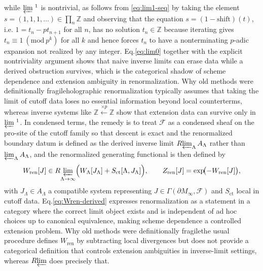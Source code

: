 \documentclass[11pt]{article}
\theoremstyle{remark}
\newcommand{\Z}{\mathbb{Z}}
\begin{document}
while \(\varprojlim{}^{\,1}\) is nontrivial, as follows from \eqref{eq:lim1-seq} by taking the element \(s=(1,1,1,\ldots)\in \prod_n \Z\) and observing that the equation \(s=(1-\mathrm{shift})(t)\), i.e. \(1=t_n-p t_{n+1}\) for all \(n\), has no solution \(t_n\in\Z\) because iterating gives \(t_n\equiv 1\ (\mathrm{mod}\ p^k)\) for all \(k\) and hence forces \(t_n\) to have a nonterminating \(p\)-adic expansion not realized by any integer. Eq.\eqref{eq:lim0} together with the explicit nontriviality argument shows that naive inverse limits can erase data while a derived obstruction survives, which is the categorical shadow of scheme dependence and extension ambiguity in renormalization. Why old methods were definitionally fragile\:holographic renormalization typically assumes that taking the limit of cutoff data loses no essential information beyond local counterterms, whereas inverse systems like \(\Z\xleftarrow{\times p}\Z\) show that extension data can survive only in \(\varprojlim{}^{\,1}\). In condensed terms, the remedy is to treat \(\mathcal{F}\) as a condensed sheaf on the pro-site of the cutoff family so that descent is exact and the renormalized boundary datum is defined as the derived inverse limit \(R\!\varprojlim_{\Lambda}A_{\Lambda}\) rather than \(\varprojlim_{\Lambda}A_{\Lambda}\), and the renormalized generating functional is then defined by
\begin{equation}\label{eq:Wren-derived}
W_{\mathrm{ren}}[J]\in R\!\varprojlim_{\Lambda\to\infty}\Bigl(W_{\Lambda}[J_{\Lambda}]+S_{\mathrm{ct}}[\Lambda,J_{\Lambda}]\Bigr),
\qquad
Z_{\mathrm{ren}}[J]=\exp\!\bigl(-W_{\mathrm{ren}}[J]\bigr),
\end{equation}
with \(J_{\Lambda}\in A_{\Lambda}\) a compatible system representing \(J\in \Gamma(\partial M_{\infty},\mathcal{F})\) and \(S_{\mathrm{ct}}\) local in cutoff data. Eq.\eqref{eq:Wren-derived} expresses renormalization as a statement in a category where the correct limit object exists and is independent of ad hoc choices up to canonical equivalence, making scheme dependence a controlled extension problem. Why old methods were definitionally fragile\:the usual procedure defines \(W_{\mathrm{ren}}\) by subtracting local divergences but does not provide a categorical definition that controls extension ambiguities in inverse-limit settings, whereas \(R\!\varprojlim\) does precisely that.
\end{document}
